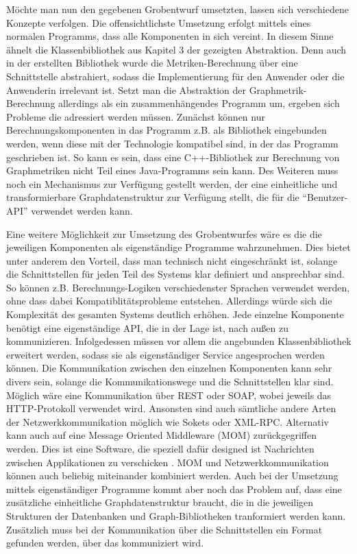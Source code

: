 \documentclass[a4paper,12pt,ngerman,chapterprefix=false,listof=totoc,bibliography=totoc]{scrreprt}
\begin{document}
{{{Möchte man nun den gegebenen Grobentwurf umsetzten, lassen sich verschiedene Konzepte verfolgen. Die offensichtlichste Umsetzung erfolgt mittels eines normalen Programms, dass alle Komponenten in sich vereint. In diesem Sinne ähnelt die Klassenbibliothek aus Kapitel 3 der gezeigten Abstraktion. Denn auch in der erstellten Bibliothek wurde die Metriken-Berechnung über eine Schnittstelle abstrahiert, sodass die Implementierung für den Anwender oder die Anwenderin irrelevant ist. Setzt man die Abstraktion der Graphmetrik-Berechnung allerdings als ein zusammenhängendes Programm um, ergeben sich Probleme die adressiert werden müssen. Zunächst können nur Berechnungskomponenten in das Programm z.B. als Bibliothek eingebunden werden, wenn diese mit der Technologie kompatibel sind, in der das Programm geschrieben ist. So kann es sein, dass eine C++-Bibliothek zur Berechnung von Graphmetriken nicht Teil eines Java-Programms sein kann. Des Weiteren muss noch ein Mechanismus zur Verfügung gestellt werden, der eine einheitliche und transformierbare Graphdatenstruktur zur Verfügung stellt, die für die "`Benutzer-API"' verwendet werden kann.

Eine weitere Möglichkeit zur Umsetzung des Grobentwurfes wäre es die die jeweiligen Komponenten als eigenständige Programme wahrzunehmen. Dies bietet unter anderem den Vorteil, dass man technisch nicht eingeschränkt ist, solange die Schnittstellen für jeden Teil des Systems klar definiert und ansprechbar sind. So können z.B. Berechnungs-Logiken verschiedenster Sprachen verwendet werden, ohne dass dabei Kompatiblitätsprobleme entstehen. Allerdings würde sich die Komplexität des gesamten Systems deutlich erhöhen. Jede einzelne Komponente benötigt eine eigenständige API, die in der Lage ist, nach außen zu kommunizieren. Infolgedessen müssen vor allem die angebunden Klassenbibliothek erweitert werden, sodass sie als eigenständiger Service angesprochen werden können. Die Kommunikation zwischen den einzelnen Komponenten kann sehr divers sein, solange die Kommunikationswege und die Schnittstellen klar sind. Möglich wäre eine Kommunikation über REST oder SOAP, wobei jeweils das HTTP-Protokoll verwendet wird. Ansonsten sind auch sämtliche andere Arten der Netzwerkkommunikation möglich wie Sokets oder XML-RPC. \cite{balzert_lehrbuch_2011} Alternativ kann auch auf eine Message Oriented Middleware (MOM) zurückgegriffen werden. Dies ist eine Software, die speziell dafür designed ist Nachrichten zwischen Applikationen zu verschicken \cite{curry_message-oriented_2005}. MOM und Netzwerkkommunikation können auch beliebig miteinander kombiniert werden. Auch bei der Umsetzung mittels eigenständiger Programme kommt aber noch das Problem auf, dass eine zusätzliche einheitliche Graphdatenstruktur braucht, die in die jeweiligen Strukturen der Datenbanken und Graph-Bibliotheken tranformiert werden kann. Zusätzlich muss bei der Kommunikation über die Schnittstellen ein Format gefunden werden, über das kommuniziert wird.
}
}}
\end{document}
